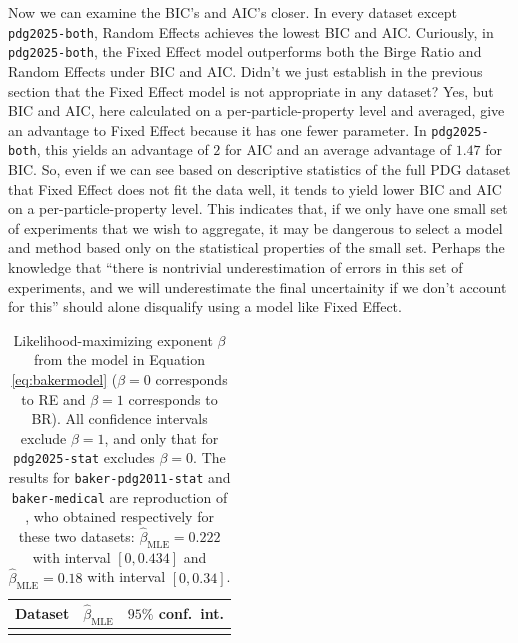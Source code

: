 \documentclass[letterpaper,12pt]{article}
\begin{document}
Now we can examine the BIC's and AIC's closer. In every dataset except \texttt{pdg2025-both}, Random Effects achieves the lowest BIC and AIC. Curiously, in \texttt{pdg2025-both}, the Fixed Effect model outperforms both the Birge Ratio and Random Effects under BIC and AIC. Didn't we just establish in the previous section that the Fixed Effect model is not appropriate in any dataset? Yes, but BIC and AIC, here calculated on a per-particle-property level and averaged, give an advantage to Fixed Effect because it has one fewer parameter. In \texttt{pdg2025-both}, this yields an advantage of $2$ for AIC and an average advantage of $1.47$ for BIC. So, even if we can see based on descriptive statistics of the full PDG dataset that Fixed Effect does not fit the data well, it tends to yield lower BIC and AIC on a per-particle-property level. This indicates that, if we only have one small set of experiments that we wish to aggregate, it may be dangerous to select a model and method based only on the statistical properties of the small set. Perhaps the knowledge that ``there is nontrivial underestimation of errors in this set of experiments, and we will underestimate the final uncertainity if we don't account for this'' should alone disqualify using a model like Fixed Effect.

\begin{table}[htbp]
  \centering
  \caption{Likelihood-maximizing exponent $\beta$ from the model in Equation \ref{eq:bakermodel} ($\beta=0$ corresponds to RE and $\beta=1$ corresponds to BR). All confidence intervals exclude $\beta=1$, and only that for \texttt{pdg2025-stat} excludes $\beta=0$. The results for \texttt{baker-pdg2011-stat} and \texttt{baker-medical} are reproduction of \citet[pg.~115--116]{baker2013meta}, who obtained respectively for these two datasets: $\hat\beta_{\mathrm{MLE}}=0.222$ with interval $[0, 0.434]$ and $\hat\beta_{\mathrm{MLE}}=0.18$ with interval $[0, 0.34]$.}
  \label{tab:noground-bakermodel}
  \smaller
  \begin{tabular}{l|rr}
  \hline Dataset & $\hat\beta_{\mathrm{MLE}}$ & $95\%$ conf.~int.\\\hline\\\hline
  \end{tabular}
\end{table}
\end{document}
